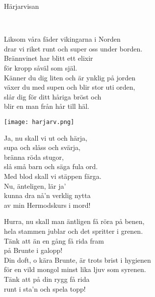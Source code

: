 \begin{song}{Härjarvisan}
	

	\\
	

    \showversenumber	
	Liksom våra fäder vikingarna i Norden\\
	drar vi riket runt och super oss under borden.\\
	Brännvinet har blitt ett elixir\\
	för kropp såväl som själ.\\
	Känner du dig liten och är ynklig på jorden\\
	växer du med supen och blir stor uti orden,\\
	slår dig för ditt håriga bröst och\\
	blir en man från hår till häl.
	
	\vspace{2cm}
	
	\begin{center}
		\texttt{[image: harjarv.png]}
	\end{center}
	
	Ja, nu skall vi ut och härja,\\
	supa och slåss och svärja,\\
	bränna röda stugor,\\
	slå små barn och säga fula ord.\\
	Med blod skall vi stäppen färga.\\
	Nu, änteligen, lär ja'\\
	kunna dra nå'n verklig nytta\\
	av min Hermodskurs i mord!
	
    \showversenumber
	Hurra, nu skall man äntligen få röra på benen,\\
	hela stammen jublar och det spritter i grenen.\\
	Tänk att än en gång få rida fram\\
	på Brunte i galopp!\\
	Din doft, o kära Brunte, är trots brist i hygienen\\
	för en vild mongol minst lika ljuv som syrenen.\\
	Tänk att på din rygg få rida\\
	runt i sta'n och spela topp!
	

\end{song}
